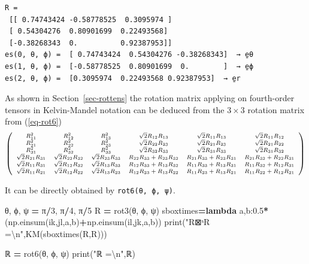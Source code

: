 \documentclass[
  a4paper,
  numbers=noendperiod,
  DIV=12]{scrreprt}
\newenvironment{Shaded}{\begin{snugshade}}{\end{snugshade}}
\newcommand{\BuiltInTok}[1]{#1}
\newcommand{\CharTok}[1]{\textcolor[rgb]{0.31,0.60,0.02}{#1}}
\newcommand{\DecValTok}[1]{\textcolor[rgb]{0.00,0.00,0.81}{#1}}
\newcommand{\FloatTok}[1]{\textcolor[rgb]{0.00,0.00,0.81}{#1}}
\newcommand{\KeywordTok}[1]{\textcolor[rgb]{0.13,0.29,0.53}{\textbf{#1}}}
\newcommand{\NormalTok}[1]{#1}
\newcommand{\OperatorTok}[1]{\textcolor[rgb]{0.81,0.36,0.00}{\textbf{#1}}}
\newcommand{\StringTok}[1]{\textcolor[rgb]{0.31,0.60,0.02}{#1}}
\begin{document}
\begin{verbatim}
R =
 [[ 0.74743424 -0.58778525  0.3095974 ]
 [ 0.54304276  0.80901699  0.22493568]
 [-0.38268343  0.          0.92387953]]
es(0, θ, ϕ) =  [ 0.74743424  0.54304276 -0.38268343]  → e̱θ
es(1, θ, ϕ) =  [-0.58778525  0.80901699  0.        ]  → e̱ϕ
es(2, θ, ϕ) =  [0.3095974  0.22493568 0.92387953]  → e̱r
\end{verbatim}

As shown in Section~\ref{sec-rottens} the rotation matrix applying on
fourth-order tensors in Kelvin-Mandel notation can be deduced from the
\(3×3\) rotation matrix from (\ref{eq-rot6}) \[
\scriptsize
   \left(
\begin{array}{cccccc}
R_{1 1}^{2} & R_{1 2}^{2} & R_{1 3}^{2} & \sqrt{2}  R_{1 2}  R_{1 3} & \sqrt{2}  R_{1 1}  R_{1 3} & \sqrt{2}  R_{1 1}  R_{1 2} \\
R_{2 1}^{2} & R_{2 2}^{2} & R_{2 3}^{2} & \sqrt{2}  R_{2 2}  R_{2 3} & \sqrt{2}  R_{2 1}  R_{2 3} & \sqrt{2}  R_{2 1}  R_{2 2} \\
R_{3 1}^{2} & R_{3 2}^{2} & R_{3 3}^{2} & \sqrt{2}  R_{3 2}  R_{3 3} & \sqrt{2}  R_{3 1}  R_{3 3} & \sqrt{2}  R_{3 1}  R_{3 2} \\
\sqrt{2}  R_{2 1}  R_{3 1} & \sqrt{2}  R_{2 2}  R_{3 2} & \sqrt{2}  R_{2 3}  R_{3 3} & R_{2 2}  R_{3 3} + R_{2 3}  R_{3 2} & R_{2 1}  R_{3 3} + R_{2 3}  R_{3 1} & R_{2 1}  R_{3 2} + R_{2 2}  R_{3 1} \\
\sqrt{2}  R_{1 1}  R_{3 1} & \sqrt{2}  R_{1 2}  R_{3 2} & \sqrt{2}  R_{1 3}  R_{3 3} & R_{1 2}  R_{3 3} + R_{1 3}  R_{3 2} & R_{1 1}  R_{3 3} + R_{1 3}  R_{3 1} & R_{1 1}  R_{3 2} + R_{1 2}  R_{3 1} \\
\sqrt{2}  R_{1 1}  R_{2 1} & \sqrt{2}  R_{1 2}  R_{2 2} & \sqrt{2}  R_{1 3}  R_{2 3} & R_{1 2}  R_{2 3} + R_{1 3}  R_{2 2} & R_{1 1}  R_{2 3} + R_{1 3}  R_{2 1} & R_{1 1}  R_{2 2} + R_{1 2}  R_{2 1} \\
\end{array}
\right)
\]

It can be directly obtained by \texttt{rot6(θ,\ ϕ,\ ψ)}.

\begin{Shaded}
\begin{Highlighting}[]
\NormalTok{θ, ϕ, ψ }\OperatorTok{=}\NormalTok{ π}\OperatorTok{/}\DecValTok{3}\NormalTok{, π}\OperatorTok{/}\DecValTok{4}\NormalTok{, π}\OperatorTok{/}\DecValTok{5}
\NormalTok{R }\OperatorTok{=}\NormalTok{ rot3(θ, ϕ, ψ)}
\NormalTok{sboxtimes}\OperatorTok{=}\KeywordTok{lambda}\NormalTok{ a,b:}\FloatTok{0.5}\OperatorTok{*}\NormalTok{(np.einsum(}\StringTok{\textquotesingle{}ik,jl\textquotesingle{}}\NormalTok{,a,b)}\OperatorTok{+}\NormalTok{np.einsum(}\StringTok{\textquotesingle{}il,jk\textquotesingle{}}\NormalTok{,a,b))}
\BuiltInTok{print}\NormalTok{(}\StringTok{"R⊠ˢR =}\CharTok{\textbackslash{}n}\StringTok{"}\NormalTok{,KM(sboxtimes(R,R)))}

\NormalTok{ℝ }\OperatorTok{=}\NormalTok{ rot6(θ, ϕ, ψ)}
\BuiltInTok{print}\NormalTok{(}\StringTok{"ℝ =}\CharTok{\textbackslash{}n}\StringTok{"}\NormalTok{,ℝ)}
\end{Highlighting}
\end{Shaded}
\end{document}
